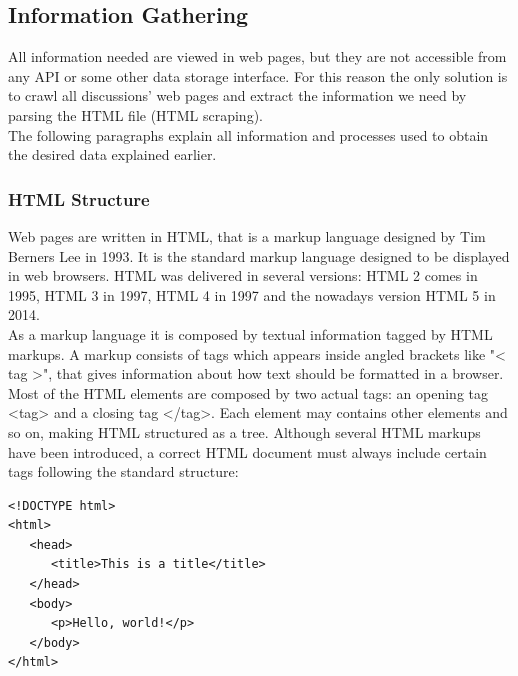 \subsection{Information Gathering}

All information needed are viewed in web pages, but they are not accessible from any API or some other data storage interface. For this reason the only solution is to crawl all discussions' web pages and extract the information we need by parsing the \ac{HTML} file (\ac{HTML} scraping). \\
The following paragraphs explain all information and processes used to obtain the desired data explained earlier.

\subsubsection{HTML Structure}

Web pages are written in \ac{HTML}, that is a markup language designed by Tim Berners Lee in 1993. It is the standard markup language designed to be displayed in web browsers. HTML was delivered in several versions: \ac{HTML} 2 comes in 1995, \ac{HTML} 3 in 1997, \ac{HTML} 4 in 1997 and the nowadays version HTML 5 in 2014. \\
As a markup language it is composed by textual information tagged by \ac{HTML} markups. A markup consists of tags which appears inside angled brackets  like "< tag >", that gives information about how text should be formatted in a browser.	Most of the \ac{HTML} elements are composed by two actual tags: an opening tag <tag> and a closing tag </tag>. Each element may contains other elements and so on, making \ac{HTML} structured as a tree. Although several HTML markups have been introduced, a correct HTML document must always include certain tags following the standard structure:

\begin{center}
\begin{lstlisting}
<!DOCTYPE html>
<html>
   <head>
      <title>This is a title</title>
   </head>
   <body>
      <p>Hello, world!</p>
   </body>
</html>
\end{lstlisting}
\end{center}

